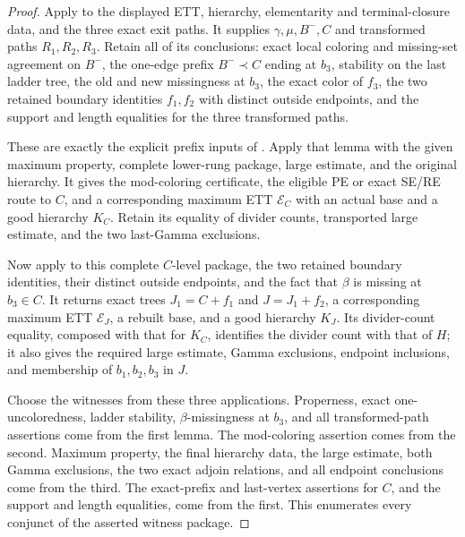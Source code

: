 \begin{proof}
Apply  to the displayed ETT,
hierarchy, elementarity and terminal-closure data, and the three exact
exit paths.  It supplies $\gamma,\mu,B^-,C$ and transformed paths
$R_1,R_2,R_3$.  Retain all of its conclusions: exact local coloring and
missing-set agreement on $B^-$, the one-edge prefix $B^-\prec C$ ending
at $b_3$, stability on the last ladder tree, the old and new missingness
at $b_3$, the exact color of $f_3$, the two retained boundary identities
$f_1,f_2$ with distinct outside endpoints, and the support and length
equalities for the three transformed paths.

These are exactly the explicit prefix inputs of
.  Apply that lemma with the
given maximum property, complete lower-rung package, large estimate, and
the original hierarchy.  It gives the mod-coloring certificate, the
eligible PE or exact SE/RE route to $C$, and a corresponding maximum ETT
$\mathcal E_C$ with an actual base and a good hierarchy $K_C$.  Retain
its equality of divider counts, transported large estimate, and the two
last-Gamma exclusions.

Now apply  to this complete
$C$-level package, the two retained boundary identities, their distinct
outside endpoints, and the fact that $\beta$ is missing at $b_3\in C$.
It returns exact trees $J_1=C+f_1$ and $J=J_1+f_2$, a corresponding
maximum ETT $\mathcal E_J$, a rebuilt base, and a good hierarchy $K_J$.
Its divider-count equality, composed with that for $K_C$, identifies the
divider count with that of $H$; it also gives the required large estimate,
Gamma exclusions, endpoint inclusions, and membership of $b_1,b_2,b_3$
in $J$.

Choose the witnesses from these three applications.  Properness, exact
one-uncoloredness, ladder stability, $\beta$-missingness at $b_3$, and
all transformed-path assertions come from the first lemma.  The
mod-coloring assertion comes from the second.  Maximum property, the
final hierarchy data, the large estimate, both Gamma exclusions, the two
exact adjoin relations, and all endpoint conclusions come from the third.
The exact-prefix and last-vertex assertions for $C$, and the support and
length equalities, come from the first.  This enumerates every conjunct
of the asserted witness package.
\end{proof}
